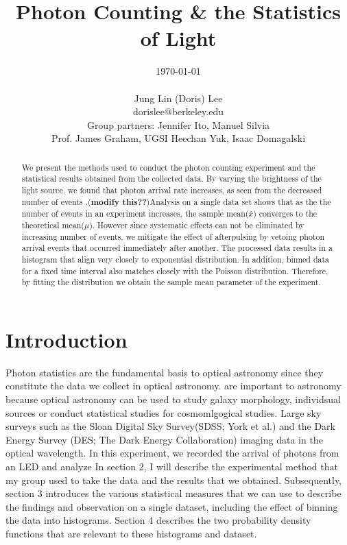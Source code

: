 \documentclass[authoryear, 12pt,5p, Times]{elsarticle}
\begin{document}
\begin{frontmatter}
\title{Photon Counting \& the Statistics of Light}
\author{\today \\ \quad \\Jung Lin (Doris) Lee\\ dorislee@berkeley.edu\\Group partners: Jennifer Ito, Manuel Silvia\\Prof. James Graham, UGSI Heechan Yuk, Isaac Domagalski}
	\begin{abstract}
	 We present the methods used to conduct the photon counting experiment and the statistical results obtained from the collected data. By varying the brightness of the light source, we found that photon arrival rate increases, as seen from the decreased number of events .(\textbf{modify this??})Analysis on a single data set shows that as the the number of events in an experiment increases, the sample mean($\bar{x}$) converges to the theoretical mean($\mu$). However since systematic effects can not be eliminated by increasing number of events, we mitigate the effect of afterpulsing by vetoing photon arrival events that occurred immediately after another. The processed data results in a histogram that align very closely to exponential distribution. In addition, binned data for a fixed time interval also matches closely with the Poisson distribution. Therefore, by fitting the distribution we obtain the sample mean parameter of the experiment.  
	\end{abstract}
\end{frontmatter}
\section{Introduction\label{intro}}
\indent Photon statistics are the fundamental basis to optical astronomy since they constitute the data we collect in optical astronomy. 
are important to astronomy because 
optical astronomy 
can be used to study galaxy morphology, individsual sources or conduct statistical studies for cosmomlgogical studies.
Large sky surveys such as the Sloan Digital Sky Survey(SDSS; York et al.) and the Dark Energy Survey (DES; The Dark Energy Collaboration) imaging data in the optical wavelength.
\indent In this experiment, we recorded the arrival of photons from an LED and analyze
 In section 2, I will describe the experimental method that my group used to take the data and the results that we obtained. Subsequently, section 3 introduces the various statistical measures that we can use to describe the findings and observation on  a single dataset, including the effect of binning the data into histograms. Section 4 describes the two probability density functions that are relevant to these histograms and dataset.
\end{document}
